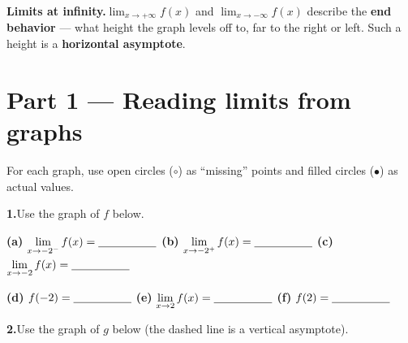 \documentclass[12pt]{article}
\newcommand{\gridaxes}[1]{%
  \draw[step=1,gray!25,very thin] (-#1,-#1) grid (#1,#1);%
  \draw[thick,->] (-#1-0.4,0)--(#1+0.4,0) node[right]{$x$};%
  \draw[thick,->] (0,-#1-0.4)--(0,#1+0.4) node[above]{$y$};%
  \foreach \n in {-#1,...,#1}{\ifnum\n=0\else
      \draw (\n,0.08)--(\n,-0.08) node[below]{\scriptsize$\n$};
      \draw (0.08,\n)--(-0.08,\n) node[left]{\scriptsize$\n$};\fi}%
}
\begin{document}
\textbf{Limits at infinity.}\quad $\displaystyle\lim_{x \to +\infty} f(x)$ and
$\displaystyle\lim_{x \to -\infty} f(x)$ describe the \textbf{end behavior} --- what height the graph levels off
to, far to the right or left. Such a height is a \textbf{horizontal asymptote}.

\newpage
\section*{Part 1 --- Reading limits from graphs}
For each graph, use open circles ($\circ$) as ``missing'' points and filled circles ($\bullet$) as actual values.

\bigskip
\textbf{1.}\quad Use the graph of $f$ below.

\begin{center}
\end{center}

\textbf{(a)} $\displaystyle\lim_{x \to -2^-} f(x) = \underline{\hspace{1.8cm}}$\quad
\textbf{(b)} $\displaystyle\lim_{x \to -2^+} f(x) = \underline{\hspace{1.8cm}}$\quad
\textbf{(c)} $\displaystyle\lim_{x \to -2} f(x) = \underline{\hspace{1.8cm}}$

\medskip
\textbf{(d)} $f(-2) = \underline{\hspace{1.8cm}}$\quad
\textbf{(e)} $\displaystyle\lim_{x \to 2} f(x) = \underline{\hspace{1.8cm}}$\quad
\textbf{(f)} $f(2) = \underline{\hspace{1.8cm}}$

\bigskip
\newpage
\textbf{2.}\quad Use the graph of $g$ below (the dashed line is a vertical asymptote).

\begin{center}
\end{center}
\end{document}
